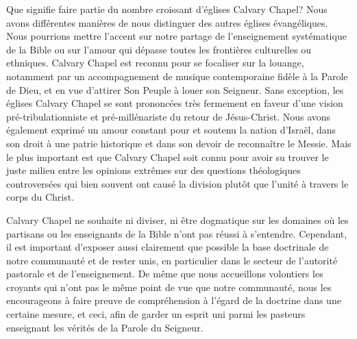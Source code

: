 
Que signifie faire partie du nombre croissant d'églises Calvary Chapel?
 Nous avons différentes manières de nous distinguer des autres églises évangéliques.
 Nous pourrions mettre l'accent sur notre partage de l'enseignement systématique de la Bible
 ou sur l'amour qui dépasse toutes les frontières culturelles ou ethniques.
Calvary Chapel est reconnu pour se focaliser sur la louange,
 notamment par un accompagnement de musique contemporaine fidèle à la Parole de Dieu,
 et en vue d'attirer Son Peuple à louer son Seigneur.
 Sans exception, les églises Calvary Chapel se sont prononcées très fermement
 en faveur d'une vision pré-tribulationniste et pré-millénariste du retour de Jésus-Christ.
Nous avons également exprimé un amour constant pour et soutenu la nation d'Israël,
 dans son droit à une patrie historique  et dans son devoir de reconnaître le Messie.
 Mais le plus important est que Calvary Chapel soit connu pour avoir su trouver
 le juste milieu entre les opinions extrêmes sur des questions théologiques
 controversées qui bien souvent ont causé la division plutôt que l'unité
 à travers le corps du Christ.

Calvary Chapel ne souhaite ni diviser, ni être dogmatique sur les domaines où les partisans
 ou les enseignants de la Bible n'ont pas réussi à s'entendre.
 Cependant, il est important d'exposer aussi clairement que possible la base doctrinale
 de notre communauté et de rester unis, en particulier dans le secteur de l'autorité pastorale
 et de l'enseignement. De même que nous accueillons volontiers les croyants qui n'ont pas
 le même point de vue que notre communauté, nous les encourageons à faire preuve de compréhension
 à l'égard de la doctrine dans une certaine mesure, et ceci, afin de garder un esprit uni
 parmi les pasteurs enseignant les vérités de la Parole du Seigneur.


